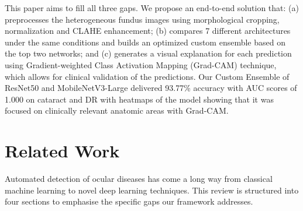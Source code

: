 \documentclass[conference]{IEEEtran}
\begin{document}
This paper aims to fill all three gaps. We propose an end-to-end solution that: (a) preprocesses the heterogeneous fundus images using morphological cropping, normalization and CLAHE enhancement; (b) compares 7 different architectures under the same conditions and builds an optimized custom ensemble based on the top two networks; and (c) generates a visual explanation for each prediction using Gradient-weighted Class Activation Mapping (Grad-CAM) technique, which allows for clinical validation of the predictions. Our Custom Ensemble of ResNet50 and MobileNetV3-Large delivered 93.77\% accuracy with AUC scores of 1.000 on cataract and DR with heatmaps of the model showing that it was focused on clinically relevant anatomic areas with Grad-CAM.

\section{Related Work}

Automated detection of ocular diseases has come a long way from classical machine learning to novel deep learning techniques. This review is structured into four sections to emphasise the specific gaps our framework addresses.
\end{document}
